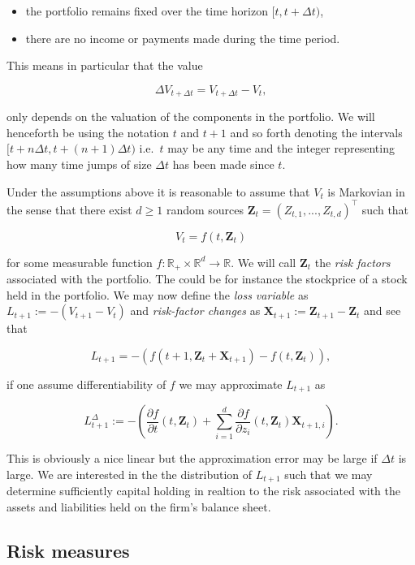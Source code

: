 \documentclass[
]{book}
\providecommand{\tightlist}{%
  \setlength{\itemsep}{0pt}\setlength{\parskip}{0pt}}
\begin{document}
\begin{itemize}
\tightlist
\item
  the portfolio remains fixed over the time horizon \([t,t+\Delta t)\),
\item
  there are no income or payments made during the time period.
\end{itemize}

This means in particular that the value

\[
\Delta V_{t+\Delta t}=V_{t+\Delta t}-V_t,
\]

only depends on the valuation of the components in the portfolio. We will henceforth be using the notation \(t\) and \(t+1\) and so forth denoting the intervals \([t+n\Delta t,t+(n+1)\Delta t)\) i.e.~\(t\) may be any time and the integer representing how many time jumps of size \(\Delta t\) has been made since \(t\).

Under the assumptions above it is reasonable to assume that \(V_t\) is Markovian in the sense that there exist \(d\ge 1\) random sources \(\mathbf{Z}_t=(Z_{t,1},...,Z_{t,d})^\top\) such that

\[
V_t=f(t,\mathbf{Z}_t)\tag{2.2}
\]

for some measurable function \(f : \mathbb{R}_+\times \mathbb{R}^d\to\mathbb{R}\). We will call \(\mathbf{Z}_t\) the \emph{risk factors} associated with the portfolio. The could be for instance the stockprice of a stock held in the portfolio. We may now define the \emph{loss variable} as \(L_{t+1}:=-(V_{t+1}-V_t)\) and \emph{risk-factor changes} as \(\mathbf{X}_{t+1}:=\mathbf{Z}_{t+1}-\mathbf{Z}_t\) and see that

\[
L_{t+1}=-\left(f(t+1,\mathbf{Z}_t+\mathbf{X}_{t+1})-f(t,\mathbf{Z}_t)\right),\tag{2.3}
\]

if one assume differentiability of \(f\) we may approximate \(L_{t+1}\) as

\[
L_{t+1}^\Delta:=-\left(\frac{\partial f}{\partial t}(t,\mathbf{Z}_t)+\sum_{i=1}^d \frac{\partial f}{\partial z_i}(t,\mathbf{Z}_t)\mathbf{X}_{t+1,i}\right).\tag{2.4}
\]

This is obviously a nice linear but the approximation error may be large if \(\Delta t\) is large. We are interested in the the distribution of \(L_{t+1}\) such that we may determine sufficiently capital holding in realtion to the risk associated with the assets and liabilities held on the firm's balance sheet.

\hypertarget{risk-measures}{%
\subsection{Risk measures}\label{risk-measures}}
\end{document}
